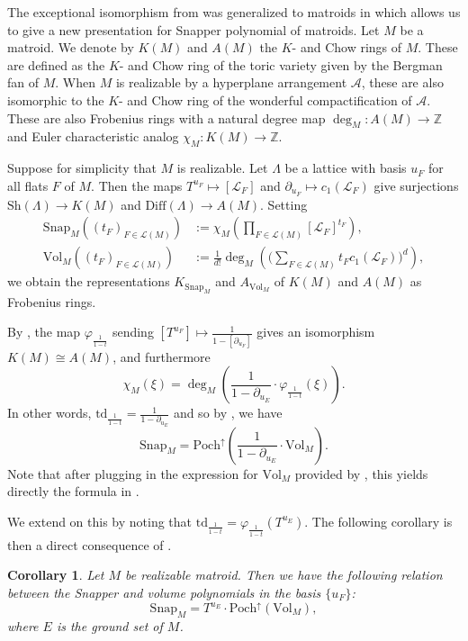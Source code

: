 \documentclass[oneside]{amsart}
\theoremstyle{plain}
\newtheorem{corollary}[theorem]{Corollary}
\theoremstyle{definition}
\newcommand{\Z}{{\mathbb{Z}}}
\newcommand{\cL}{{\mathcal{L}}}
\newcommand{\cA}{{\mathcal{A}}}
\newcommand{\Diff}{{\mathrm{Diff}}}
\newcommand{\Vol}{{\mathrm{Vol}}}
\newcommand{\Snap}{{\mathrm{Snap}}}
\newcommand{\Sh}{{\mathrm{Sh}}}
\newcommand{\td}{{\mathrm{td}}}
\newcommand{\Poch}{{\mathrm{Poch}}}
\begin{document}
The exceptional isomorphism from  was generalized to matroids in \cite{LLPP24} which allows us to give a new presentation for Snapper polynomial of matroids.
Let $M$ be a matroid. We denote by $K(M)$ and $A(M)$ the $K$- and Chow rings of $M$. These are defined as the $K$- and Chow ring of the toric variety given by the Bergman fan of $M$. When $M$ is realizable by a hyperplane arrangement $\cA$, these are also isomorphic to the $K$- and Chow ring of the wonderful compactification of $\cA$.
These are also Frobenius rings with a natural degree map $\deg_M: A(M) \to \Z$ and Euler characteristic analog $\chi_M: K(M) \to \Z$. \cite{FY04, CombinatorialHodge, LLPP24}

Suppose for simplicity that $M$ is realizable. Let $\Lambda$ be a lattice with basis $u_F$ for all flats $F$ of $M$. Then the maps $T^{u_F} \mapsto [\cL_F]$ and
$\partial_{u_F} \mapsto c_1(\cL_F)$ give surjections $\Sh(\Lambda) \to K(M)$ and $\Diff(\Lambda) \to A(M)$.
Setting
\begin{align*}
    \Snap_M((t_F)_{F \in \cL(M)}) &:= \chi_M\left(\prod_{F \in \cL(M)} [\cL_F]^{t_F}\right),\\
    \Vol_M((t_F)_{F \in \cL(M)}) &:= \frac{1}{d!}\deg_M\left(\bigg(\sum_{F \in \cL(M)} t_F c_1(\cL_F)\bigg)^d\right),
\end{align*}
we obtain the representations $K_{\Snap_M}$ and $A_{\Vol_M}$ of $K(M)$ and $A(M)$ as Frobenius rings.

By \cite[Theorem 1.2]{LLPP24}, the map $\varphi_{\frac{1}{1 - t}}$ sending $[T^{u_F}] \mapsto \frac{1}{1 -[\partial_{u_F}]}$ gives an isomorphism $K(M) \cong A(M)$, and furthermore
\[\chi_M(\xi) = \deg_M\left(\frac{1}{1 - \partial_{u_E}} \cdot \varphi_{\frac{1}{1 - t}}(\xi)\right).\]
In other words, $\td_{\frac{1}{1 - t}} = \frac{1}{1 - \partial_{u_E}}$ and so by , we have 
\[
    \Snap_M=\Poch^\uparrow\left(\frac{1}{1 - \partial_{u_E}}\cdot \Vol_M\right).
\]
Note that after plugging in the expression for $\Vol_M$ provided by \cite[Theorem 7.1]{LLPP24}, this yields directly the formula in \cite[Corollary 7.5]{LLPP24}.

We extend on this by noting that $\td_{\frac 1{1-t}} = \varphi_{\frac 1{1-t}}(T^{u_E})$. The following corollary is then a direct consequence of .

\begin{corollary}\label{cor:wonderful-compactification-exceptional}
   Let $M$ be realizable matroid. Then we have the following relation between the Snapper and volume polynomials in the basis $\{u_F\}$:
    \[
        \Snap_M = T^{u_E} \cdot \Poch^\uparrow(\Vol_M),
    \]
    where $E$ is the ground set of $M$.
\end{corollary}
\end{document}
